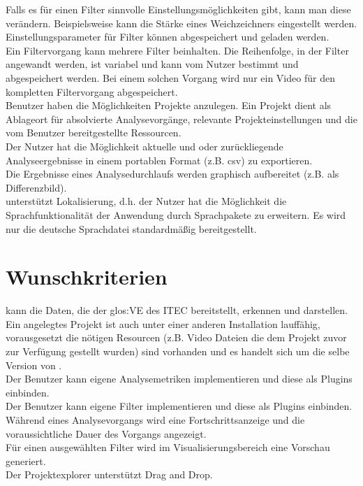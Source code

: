  Falls es für einen Filter sinnvolle Einstellungsmöglichkeiten gibt, kann man diese verändern. Beispielsweise kann die Stärke eines Weichzeichners eingestellt werden.\\
 Einstellungsparameter für Filter können abgespeichert und geladen werden.\\
 Ein Filtervorgang kann mehrere Filter beinhalten. Die Reihenfolge, in der Filter angewandt
werden, ist variabel und kann vom Nutzer bestimmt und abgespeichert werden. Bei einem solchen Vorgang wird nur ein Video für den kompletten Filtervorgang abgespeichert.\\
 Benutzer haben die Möglichkeiten Projekte anzulegen. Ein Projekt dient als Ablageort für
absolvierte Analysevorgänge, relevante Projekteinstellungen und die vom Benutzer bereitgestellte Ressourcen.\\
 Der Nutzer hat die Möglichkeit aktuelle und oder zurückliegende Analyseergebnisse in einem portablen Format (z.B. \gls{csv}) zu exportieren.\\
 Die Ergebnisse eines Analysedurchlaufs werden graphisch aufbereitet (z.B. als Differenzbild).\\
 \projektTitel unterstützt Lokalisierung, d.h. der Nutzer hat die Möglichkeit die Sprachfunktionalität der Anwendung durch Sprachpakete zu erweitern. Es wird nur die deutsche Sprachdatei standardmäßig bereitgestellt.

\section{Wunschkriterien}
\setcounter{counterKriterien}{0}
% 
 \projektTitel kann die Daten, die der \gls{glos:VE} des \gls{ITEC} bereitstellt, erkennen und darstellen.\\
 Ein angelegtes Projekt ist auch unter einer anderen \projektTitel Installation lauffähig, vorausgesetzt die nötigen Resourcen (z.B. Video Dateien die dem Projekt zuvor zur Verfügung gestellt wurden)  sind vorhanden und es handelt sich um die selbe Version von \projektTitel.\\
 Der Benutzer kann eigene Analysemetriken implementieren und diese als Plugins einbinden.\\
 Der Benutzer kann eigene Filter implementieren und diese als Plugins einbinden.\\
 Während eines Analysevorgangs wird eine Fortschrittsanzeige und die voraussichtliche Dauer des Vorgangs angezeigt.\\
 Für einen ausgewählten Filter wird im Visualisierungsbereich eine Vorschau generiert.\\
 Der Projektexplorer unterstützt Drag and Drop.
